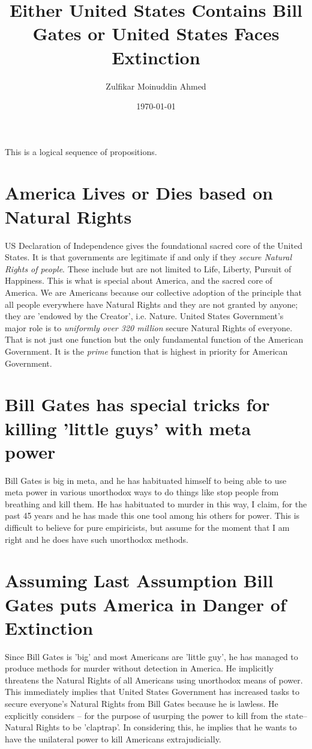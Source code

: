 \documentclass{amsart}
\title{Either United States Contains Bill Gates or United States Faces Extinction}
\author{Zulfikar Moinuddin Ahmed}
\date{\today}
\begin{document}
\maketitle

This is a logical sequence of propositions.  

\section{America Lives or Dies based on Natural Rights}

US Declaration of Independence gives the foundational sacred core of the United States.  It is that governments are legitimate if and only if they {\em secure Natural Rights of people}.  These include but are not limited to Life, Liberty, Pursuit of Happiness.  This is what is special about America, and the sacred core of America.  We are Americans because our collective adoption of the principle that all people everywhere have Natural Rights and they are not granted by anyone; they are 'endowed by the Creator', i.e.  Nature.  United States Government's major role is to {\em uniformly over 320 million} secure Natural Rights of everyone.  That is not just one function but the only fundamental function of the American Government.  It is the {\em prime} function that is highest in priority for American Government.

\section{Bill Gates has special tricks for killing 'little guys' with meta power}

Bill Gates is big in meta, and he has habituated himself to being able to use meta power in various unorthodox ways to do things like stop people from breathing and kill them.  He has habituated to murder in this way, I claim, for the past 45 years and he has made this one tool among his others for power.  This is difficult to believe for pure empiricists, but assume for the moment that I am right and he does have such unorthodox methods. 

\section{Assuming Last Assumption Bill Gates puts America in Danger of Extinction}

Since Bill Gates is 'big' and most Americans are 'little guy', he has managed to produce methods for murder without detection in America.  He implicitly threatens the Natural Rights of all Americans using unorthodox means of power.  This immediately implies that United States Government has increased tasks to secure everyone's Natural Rights from Bill Gates because he is lawless.  He explicitly considers -- for the purpose of usurping the power to kill from the state--Natural Rights to be 'claptrap'.  In considering this, he implies that he wants to have the unilateral power to kill Americans extrajudicially.  
\end{document}
